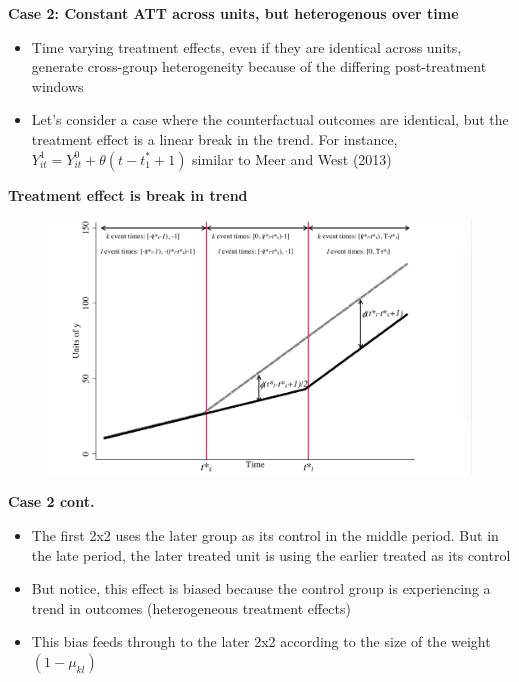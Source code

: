 \documentclass[notes=show]{beamer}
\begin{document}
\begin{frame}[plain]
\begin{center}
\textbf{Case 2: Constant ATT across units, but heterogenous over time}
\end{center}

\begin{itemize}
\item Time varying treatment effects, even if they are identical across units, generate cross-group heterogeneity because of the differing post-treatment windows
\item Let's consider a case where the counterfactual outcomes are identical, but the treatment effect is a linear break in the trend. For instance, $Y^1_{it} = Y^0_{it} + \theta (t-t^*_1+1)$ similar to Meer and West (2013)


\end{itemize}

\end{frame}

\begin{frame}[plain]
\begin{center}
\textbf{Treatment effect is break in trend}
\end{center}

	\begin{figure}
	\includegraphics[scale=0.15]{./lecture_includes/bacon_figure3.png}
	\end{figure}

\end{frame}

\begin{frame}[plain]
\begin{center}
\textbf{Case 2 cont.}
\end{center}

\begin{itemize}
\item The first 2x2 uses the later group as its control in the middle period.  But in the late period, the later treated unit is using the earlier treated as its control
\item But notice, this effect is biased because the control group is experiencing a trend in outcomes (heterogeneous treatment effects)
\item This bias feeds through to the later 2x2 according to the size of the weight $(1-\mu_{kl})$
\end{itemize}

\end{frame}
\end{document}
